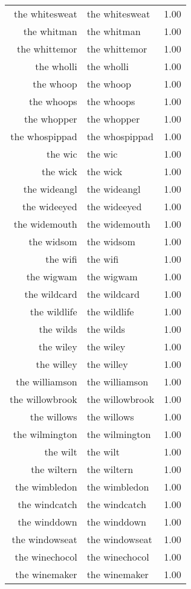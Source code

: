 \begin{table}[ht]
\begin{tabular}{rlr}
  the whitesweat & the whitesweat & 1.00 \\ 
  the whitman & the whitman & 1.00 \\ 
  the whittemor & the whittemor & 1.00 \\ 
  the wholli & the wholli & 1.00 \\ 
  the whoop & the whoop & 1.00 \\ 
  the whoops & the whoops & 1.00 \\ 
  the whopper & the whopper & 1.00 \\ 
  the whospippad & the whospippad & 1.00 \\ 
  the wic & the wic & 1.00 \\ 
  the wick & the wick & 1.00 \\ 
  the wideangl & the wideangl & 1.00 \\ 
  the wideeyed & the wideeyed & 1.00 \\ 
  the widemouth & the widemouth & 1.00 \\ 
  the widsom & the widsom & 1.00 \\ 
  the wifi & the wifi & 1.00 \\ 
  the wigwam & the wigwam & 1.00 \\ 
  the wildcard & the wildcard & 1.00 \\ 
  the wildlife & the wildlife & 1.00 \\ 
  the wilds & the wilds & 1.00 \\ 
  the wiley & the wiley & 1.00 \\ 
  the willey & the willey & 1.00 \\ 
  the williamson & the williamson & 1.00 \\ 
  the willowbrook & the willowbrook & 1.00 \\ 
  the willows & the willows & 1.00 \\ 
  the wilmington & the wilmington & 1.00 \\ 
  the wilt & the wilt & 1.00 \\ 
  the wiltern & the wiltern & 1.00 \\ 
  the wimbledon & the wimbledon & 1.00 \\ 
  the windcatch & the windcatch & 1.00 \\ 
  the winddown & the winddown & 1.00 \\ 
  the windowseat & the windowseat & 1.00 \\ 
  the winechocol & the winechocol & 1.00 \\ 
  the winemaker & the winemaker & 1.00 \\ 

\end{tabular}
\end{table}
